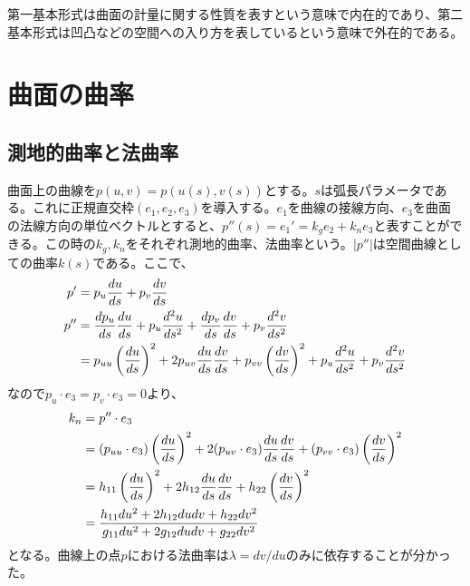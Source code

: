             第一基本形式は曲面の計量に関する性質を表すという意味で内在的であり、第二基本形式は凹凸などの空間への入り方を表しているという意味で外在的である。
            
            
    \section{曲面の曲率}
        \subsection{測地的曲率と法曲率}
            曲面上の曲線を$p(u,v)=p(u(s),v(s))$とする。$s$は弧長パラメータである。これに正規直交枠$(e_1,e_2,e_3)$を導入する。$e_1$を曲線の接線方向、$e_3$を曲面の法線方向の単位ベクトルとすると、$p''(s) = e_1' = k_ge_2+k_ne_3$と表すことができる。この時の$k_g,k_n$をそれぞれ測地的曲率、法曲率という。$|p''|$は空間曲線としての曲率$k(s)$である。ここで、
            \begin{align*}
                p' &= p_u\di[u]{s}+p_v\di[v]{s}\\
                p'' &= \di[p_u]{s}\di[u]{s}+p_u\dd[u]{s}
                + \di[p_v]{s}\di[v]{s}+p_v\dd[v]{s}\\
                &= p_{uu}\lr{\di[u]{s}}^2 + 2p_{uv}\di[u]{s}\di[v]{s} + p_{vv}\lr{\di[v]{s}}^2
                + p_u\dd[u]{s} + p_v\dd[v]{s}\\
            \end{align*}
            なので$p_u\cdot e_3=p_v\cdot e_3=0$より、
            \begin{align*}
                k_n &= p''\cdot e_3\\
                &= (p_{uu}\cdot e_3)\lr{\di[u]{s}}^2
                + 2(p_{uv}\cdot e_3)\di[u]{s}\di[v]{s}
                + (p_{vv}\cdot e_3)\lr{\di[v]{s}}^2\\
                &= h_{11}\lr{\di[u]{s}}^2+2h_{12}\di[u]{s}\di[v]{s}+h_{22}\lr{\di[v]{s}}^2\\
                &=\frac{h_{11}du^2+2h_{12}dudv+h_{22}dv^2}
                {g_{11}du^2+2g_{12}dudv+g_{22}dv^2}\\
            \end{align*}
            となる。曲線上の点$p$における法曲率は$\lambda = dv/du$のみに依存することが分かった。

